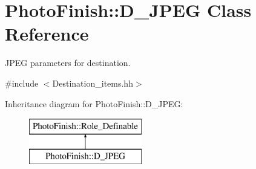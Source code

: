 \hypertarget{class_photo_finish_1_1_d___j_p_e_g}{}\section{Photo\+Finish\+:\+:D\+\_\+\+J\+P\+EG Class Reference}
\label{class_photo_finish_1_1_d___j_p_e_g}


J\+P\+EG parameters for destination.  




{\ttfamily \#include $<$Destination\+\_\+items.\+hh$>$}

Inheritance diagram for Photo\+Finish\+:\+:D\+\_\+\+J\+P\+EG\+:\begin{figure}[H]
\begin{center}
\leavevmode
\includegraphics[height=2.000000cm]{class_photo_finish_1_1_d___j_p_e_g}
\end{center}
\end{figure}
